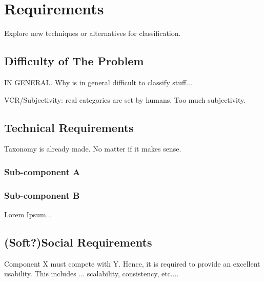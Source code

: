 \chapter{Requirements\label{cha:idealo}}
Explore new techniques or alternatives for classification.

\section{Difficulty of The Problem\label{sec:reqoverview}}
IN GENERAL. Why is in general difficult to classify stuff...

VCR/Subjectivity: real categories are set by humans. Too much subjectivity. 


\section{Technical Requirements\label{sec:techreq}}
Taxonomy is already made. No matter if it makes sense. 

\subsection{Sub-component A\label{sec:reqsuba}}


\subsection{Sub-component B\label{sec:reqsubb}}

Lorem Ipsum...

\section{(Soft?)Social Requirements\label{sec:socreq}}

Component X must compete with Y. Hence, it is required to provide an excellent usability. This includes ... scalability, consistency, etc....